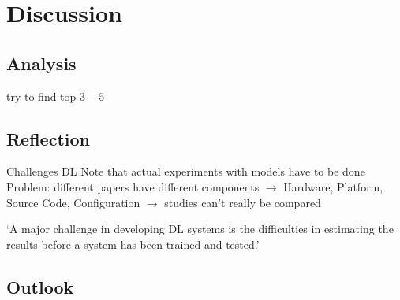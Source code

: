 \chapter{Discussion}\label{ch:discussion}
\section{Analysis}
try to find top $3-5$


\section{Reflection}
Challenges DL\cite{arpteg_software_2018}
Note that actual experiments with models have to be done
Problem: different papers have different components
$\rightarrow$ Hardware, Platform, Source Code, Configuration
$\rightarrow$ studies can't really be compared

`A major challenge in developing DL systems is the difficulties in estimating
the results before a system has been trained and tested.'~\cite{arpteg_software_2018}

\section{Outlook}
